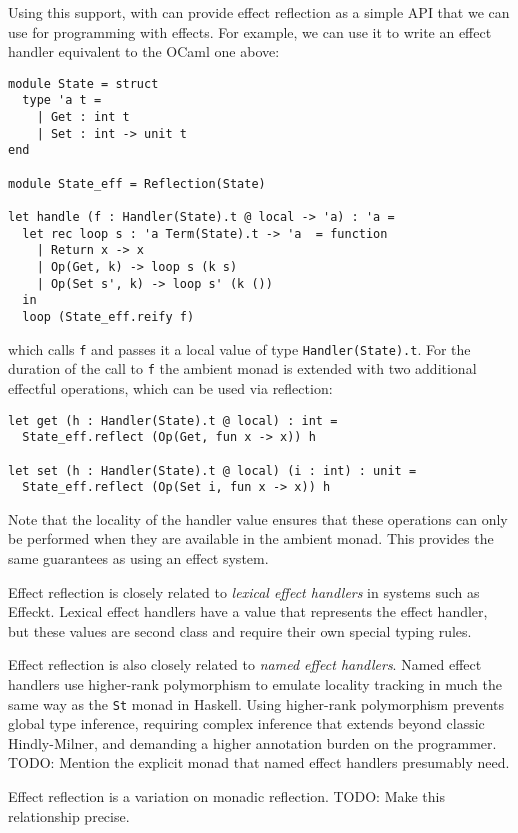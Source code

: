 \documentclass[acmsmall, screen, nonacm]{acmart}
\newcommand{\todo}[1]{{\color{red}TODO: #1}}
\begin{document}
Using this support, with can provide effect reflection as a simple API
that we can use for programming with effects.  For example, we can use
it to write an effect handler equivalent to the OCaml one above:
\begin{lstlisting}[style=ocaml]
module State = struct
  type 'a t =
    | Get : int t
    | Set : int -> unit t
end

module State_eff = Reflection(State)

let handle (f : Handler(State).t @ local -> 'a) : 'a =
  let rec loop s : 'a Term(State).t -> 'a  = function
    | Return x -> x
    | Op(Get, k) -> loop s (k s)
    | Op(Set s', k) -> loop s' (k ())
  in
  loop (State_eff.reify f)
\end{lstlisting}
which calls \lstinline[style=ocaml]{f} and passes it a local value of
type \lstinline[style=ocaml]{Handler(State).t}. For the duration of the
call to \lstinline[style=ocaml]{f} the ambient monad is extended with
two additional effectful operations, which can be used via reflection:
\begin{lstlisting}[style=ocaml]
let get (h : Handler(State).t @ local) : int =
  State_eff.reflect (Op(Get, fun x -> x)) h

let set (h : Handler(State).t @ local) (i : int) : unit =
  State_eff.reflect (Op(Set i, fun x -> x)) h
\end{lstlisting}

Note that the locality of the handler value ensures that these
operations can only be performed when they are available in the ambient
monad. This provides the same guarantees as using an effect system.

Effect reflection is closely related to \emph{lexical effect handlers} in
systems such as Effeckt\cite{??}. Lexical effect handlers have a value that
represents the effect handler, but these values are second class and
require their own special typing rules.

Effect reflection is also closely related to \emph{named effect
  handlers}\cite{??}. Named effect handlers use higher-rank polymorphism
to emulate locality tracking in much the same way as the
\lstinline[style=haskell]{St} monad in Haskell. Using higher-rank
polymorphism prevents global type inference, requiring complex inference
that extends beyond classic Hindly-Milner, and demanding a higher
annotation burden on the programmer. \todo{Mention the explicit monad
that named effect handlers presumably need.}

Effect reflection is a variation on monadic reflection\cite{??}.
\todo{Make this relationship precise.}
\end{document}
